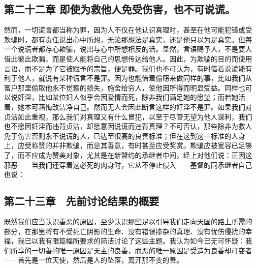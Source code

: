 
\subsection{第二十二章 即使为救他人免受伤害，也不可说谎。}

然而，一切谎言都当称为罪，因为人不仅在他认识真理时，甚至在他可能犯错或受欺骗时，都有责任说出心中所想，无论那想法是真实，还是他只以为是真实。但每一个说谎者都存心欺骗，说出与心中所想相反的话。显然，言语赐予人，不是要人借此彼此欺骗，而是使人能将自己的思想传达给他人。因此，为欺骗的目的而使用言语，而不是为了它被赋予的宗旨，便是罪。我们也不可认为，有时借着说谎能有利于他人，就说有某种谎言不是罪。因为也能借着偷窃来做同样的事，比如我们从富户那里偷取他永不觉察的损失，施舍给穷人，使他因所得而明显受益。同样也可以说奸淫，比如某位妇人似乎会因爱情而死，除非我们满足她的愿望；而若她活着，她本可藉悔改洁净自己。然而无人会因此断言这样的奸淫不是罪。如果我们对贞洁如此重视，那么我们对真理又有什么冒犯，以至于尽管无望为他人谋利，我们也不愿因奸淫而违背贞洁，却愿意因说谎而违背真理？不可否认，那些除非为救人免于伤害否则永不说谎的人，已达至很高的良善标准；但在这到这一标准的人身上，应受称赞的并非欺骗，而是其善意，有时甚至应受奖赏。欺骗应被宽容已足够了，而不应成为赞美对象，尤其是在新盟约的承继者中间，经上对他们说：正因这邪恶——当我们还穿着这必死的肉身时，它从不停止侵入——基督的同承继者自己也说：\par


\subsection{第二十三章　先前讨论结果的概要}

既然我们应当认识善恶的原因，至少认识那些足以引导我们走向天国的路上所需的部分，在那里将有不受死亡阴影的生命、没有错误掺杂的真理、没有忧伤侵扰的幸福，我已以我有限篇幅所要求的简洁讨论了这些主题。我认为如今已无可怀疑：我们所享的一切善的唯一原因是天主的良善，而恶的唯一原因是受造为良善却可变者——首先是一位天使，然后是人的坠落，离开那不变的善。\par


